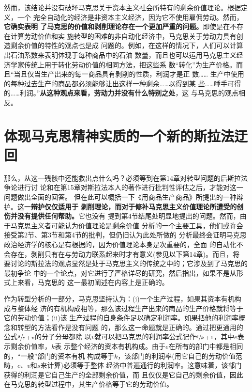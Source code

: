 然而，该结论并没有破坏马克思关于资本主义社会所特有的剩余价值理论。根据定义，一个
完全自动化的经济是非资本主义经济，因为它不使用雇佣劳动。然而，\textbf{它确实表明
  了马克思的价值和剥削理论存在一个更加严重的问题。}即使是在不存在计算劳动价值和实
施转型的困难的非自动化经济中，马克思关于劳动力具有创造剩余价值的特性的观点也是成
问题的。例如，在这样的情况下，人们可以计算出石油系数来表明体现于每种商品中的石油
数量，而且也可以运用马克思主义经济学家传统上用于转化劳动价值的相同方法，把这些系
数“转化”为生产价格。而且“当且仅当生产出来的每一商品具有剥削的性质，利润才是正
数…… 生产中使用的每种过去生产的商品都必须能够让出这样一种剩余……以得到某
些……唾手可得的……利润。”\textbf{从这种观点来看，劳动力并没有什么特别之处}，这
与马克思的观点相反。

\section{体现马克思精神实质的一个新的斯拉法迂回}

那么，从这一残骸中还能救出点什么吗？必须等到在第14章对转型问题的后斯拉法争论进行讨
论和在第15章对斯拉法本人的著作进行批判性评估之后，才能对这一问题做出全面的回答。
但在此可以概括一下《用商品生产商品》所提出的一种辩护。这一\textbf{辩护仅仅适用于
  剥削理论，而对于修补马克思主义价值理论所遭受的创伤并没有提供任何帮助。}它也没有
提到第4节结尾处明显地提出的问题。然而，由于马克思主义者可能认为价值理论是剩余价值
分析的一个主要工具，他们或许会接受第2节、第3节和第4节的批判，但仍旧认为此处所做的
分析最终会证明马克思政治经济学的核心是有根据的，因为价值理论本身是次重要的，全面
的自动化不会存在，剥削只有在与劳动力联系起来时才有意义(参见以下第14章)。而且，将
要讨论的斯拉法的观点显然是处于马克思主义的传统之中的；它涉及到了马克思的最初争论
中的一个论点，对它进行了严格详尽的研究，然后指出，如果不是从形式上来看，马克思的
这一最初阐述在内容上是正确的。

作为转型分析的一部分，马克思坚持认为：(i)一个生产过程，如果其资本有机构成与整体经
济的有机构成相等，那么该过程生产出来的商品的生产价格就将等于它的劳动价值；(ii)该
生产过程的自身条件足以确定利润率。如果把他的利润率概念和转型的方法看作是没有问题
的，那么这一命题就是正确的。通过把更通用的公式$\sfrac{s}{c+v}$的分子分母都除
以$v$就可以把马克思的利润率公式记作$\sfrac{e}{k+1}$，其中$e$表示剩余价值率，$k$表
示整个经济的资本有机构成。由于$e$在所有的部门中都是相同的，“一般”部门的资本有机
构成等于$k$，该部门的利润率(用它自己的劳动价值范畴，$c、v和s$来计算)必须等于整体
经济中普遍通行的利润率。这意味着，该部门获得的利润是它自己生产的全部剩余价值，而
且仅仅是它自己的剩余价值，因此在马克思的转型过程中，其生产价格等于它的劳动价值。

